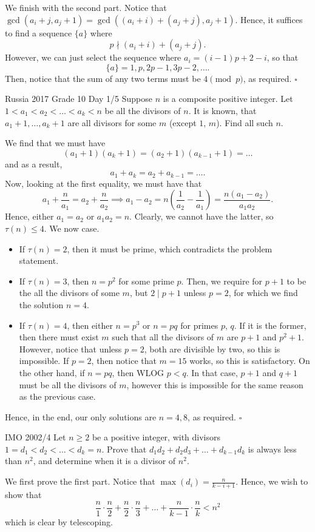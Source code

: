 \documentclass{article}
\begin{document}
We finish with the second part. Notice that $\gcd(a_i + j, a_j + 1) = \gcd((a_i+i)+(a_j+j), a_j+1)$. Hence, it suffices to find a sequence $\{a\}$ where \[p \nmid (a_i+i)+(a_j+j).\] However, we can just select the sequence where $a_i = (i-1)p+2-i$, so that \[\{a\} = 1, p, 2p-1, 3p-2, \dots.\] Then, notice that the sum of any two terms must be $4 \pmod{p}$, as required. $\square$

\begin{problem}[1.12.12]{Russia 2017 Grade 10 Day 1/5}
Suppose $n$ is a composite positive integer. Let $1 < a_1 < a_2 < \dots < a_k < n$ be all the divisors of $n$. It is known, that $a_1 + 1, \dots , a_k + 1$ are all divisors for some $m$ (except $1$, $m$). Find all such $n$.
\end{problem}
We find that we must have \[(a_1+1)(a_k+1) = (a_2+1)(a_{k-1}+1) = \dots\] and as a result, \[a_1+a_k = a_2+a_{k-1} = \dots.\] Now, looking at the first equality, we must have that \[a_1+\dfrac{n}{a_1} = a_2+\dfrac{n}{a_2} \implies a_1-a_2 = n\left(\dfrac{1}{a_2}-\dfrac{1}{a_1}\right) = \dfrac{n(a_1-a_2)}{a_1a_2}.\] Hence, either $a_1 = a_2$ or $a_1a_2 = n$. Clearly, we cannot have the latter, so $\tau(n) \le 4$. We now case.
\begin{itemize}
\item If $\tau(n) = 2$, then it must be prime, which contradicts the problem statement.
\item If $\tau(n) = 3$, then $n = p^2$ for some prime $p$. Then, we require for $p+1$ to be the all the divisors of some $m$, but $2 \mid p+1$ unless $p = 2$, for which we find the solution $n = 4$.
\item If $\tau(n) = 4$, then either $n = p^3$ or $n = pq$ for primes $p$, $q$. If it is the former, then there must exist $m$ such that all the divisors of $m$ are $p+1$ and $p^2+1$. However, notice that unless $p = 2$, both are divisible by two, so this is impossible. If $p = 2$, then notice that $m = 15$ works, so this is satisfactory. On the other hand, if $n = pq$, then WLOG $p < q$. In that case, $p+1$ and $q+1$ must be all the divisors of $m$, however this is impossible for the same reason as the previous case.
\end{itemize}
Hence, in the end, our only solutions are $n = \boxed{4, 8}$, as required. $\square$

\begin{problem}[1.12.13]{IMO 2002/4}
Let $n \ge 2$ be a positive integer, with divisors $1 = d_1 < d_2 < \dots < d_k = n$. Prove that $d_1d_2 + d_2d_3 + \dots + d_{k-1}d_k$ is always less than $n^2$, and determine when it is a divisor of $n^2$.
\end{problem}
We first prove the first part. Notice that $\max(d_i) = \tfrac{n}{k-i+1}$. Hence, we wish to show that \[\dfrac{n}{1}\cdot \dfrac{n}{2}+\dfrac{n}{2}\cdot\dfrac{n}{3}+\dots+\dfrac{n}{k-1}\cdot\dfrac{n}{k} < n^2\] which is clear by telescoping.
\end{document}
